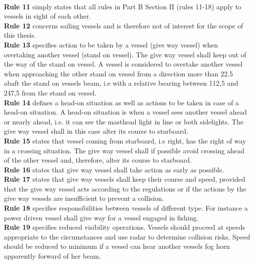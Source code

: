 \\
\textbf{Rule 11} simply states that all rules in Part B Section II (rules 11-18) apply to vessels in sight of each other.
\\
\textbf{Rule 12} concerns sailing vessels and is therefore not of interest for the scope of this thesis.
\\
\textbf{Rule 13} specifies action to be taken by a vessel (give way vessel) when overtaking another vessel (stand on vessel). The give way vessel shall keep out of the way of the stand on vessel. A vessel is considered to overtake another vessel when approaching the other stand on vessel from a direction more than 22.5 \textdegree abaft the stand on vessels beam, i.e with a relative bearing between 112,5 \textdegree and 247,5 \textdegree from the stand on vessel.
\\
\textbf{Rule 14} defines a head-on situation as well as actions to be taken in case of a head-on situation. A head-on situation is when a vessel sees another vessel ahead or nearly ahead, i.e. it can see the masthead light in line or both sidelights. The give way vessel shall in this case alter its course to starboard.
\\
\textbf{Rule 15} states that vessel coming from starboard, i.e right, has the right of way in a crossing situation. The give way vessel shall if possible avoid crossing ahead of the other vessel and, therefore, alter its course to starboard.
\\
\textbf{Rule 16} states that give way vessel shall take action as early as possible.
\\
\textbf{Rule 17} states that give way vessels shall keep their course and speed, provided that the give way vessel acts according to the regulations or if the actions by the give way vessels are insufficient to prevent a collision.
\\
\textbf{Rule 18} specifies responsibilities between vessels of different type. For instance a power driven vessel shall give way for a vessel engaged in fishing.
\\
\textbf{Rule 19} specifies reduced visibility operations. Vessels should proceed at speeds appropriate to the circumstances and use radar to determine collision risks. Speed should be reduced to minimum if a vessel can hear another vessels fog horn apparently forward of her beam.

